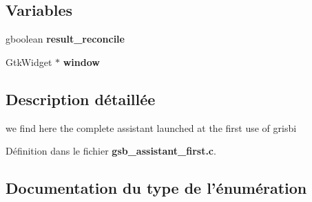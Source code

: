 \subsection*{Variables}
\begin{DoxyCompactItemize}
\item 
gboolean {\bf result\_\-reconcile}
\item 
GtkWidget $\ast$ {\bf window}
\end{DoxyCompactItemize}


\subsection{Description détaillée}
we find here the complete assistant launched at the first use of grisbi 

Définition dans le fichier {\bf gsb\_\-assistant\_\-first.c}.



\subsection{Documentation du type de l'énumération}
